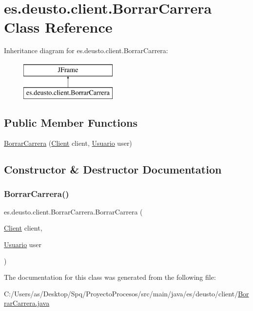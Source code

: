 \hypertarget{classes_1_1deusto_1_1client_1_1_borrar_carrera}{}\section{es.\+deusto.\+client.\+Borrar\+Carrera Class Reference}
\label{classes_1_1deusto_1_1client_1_1_borrar_carrera}
Inheritance diagram for es.\+deusto.\+client.\+Borrar\+Carrera\+:\begin{figure}[H]
\begin{center}
\leavevmode
\includegraphics[height=2.000000cm]{classes_1_1deusto_1_1client_1_1_borrar_carrera}
\end{center}
\end{figure}
\subsection*{Public Member Functions}
\begin{DoxyCompactItemize}
\item 
\mbox{\hyperlink{classes_1_1deusto_1_1client_1_1_borrar_carrera_a9fecff6662045446f0475bc998ba19b5}{Borrar\+Carrera}} (\mbox{\hyperlink{classes_1_1deusto_1_1client_1_1_client}{Client}} client, \mbox{\hyperlink{classes_1_1deusto_1_1server_1_1jdo_1_1_usuario}{Usuario}} user)
\end{DoxyCompactItemize}


\subsection{Constructor \& Destructor Documentation}
\mbox{\label{classes_1_1deusto_1_1client_1_1_borrar_carrera_a9fecff6662045446f0475bc998ba19b5}} 
\subsubsection{\texorpdfstring{BorrarCarrera()}{BorrarCarrera()}}
{\footnotesize\ttfamily es.\+deusto.\+client.\+Borrar\+Carrera.\+Borrar\+Carrera (\begin{DoxyParamCaption}\item[{\mbox{\hyperlink{classes_1_1deusto_1_1client_1_1_client}{Client}}}]{client,  }\item[{\mbox{\hyperlink{classes_1_1deusto_1_1server_1_1jdo_1_1_usuario}{Usuario}}}]{user }\end{DoxyParamCaption})}



The documentation for this class was generated from the following file\+:\begin{DoxyCompactItemize}
\item 
C\+:/\+Users/as/\+Desktop/\+Spq/\+Proyecto\+Procesos/src/main/java/es/deusto/client/\mbox{\hyperlink{_borrar_carrera_8java}{Borrar\+Carrera.\+java}}\end{DoxyCompactItemize}
